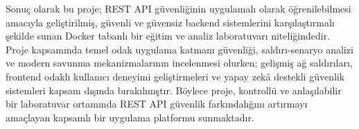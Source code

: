 Sonuç olarak bu proje; REST API güvenliğinin uygulamalı olarak öğrenilebilmesi amacıyla geliştirilmiş, güvenli ve güvensiz backend sistemlerini karşılaştırmalı şekilde sunan Docker tabanlı bir eğitim ve analiz laboratuvarı niteliğindedir. Proje kapsamında temel odak uygulama katmanı güvenliği, saldırı-senaryo analizi ve modern savunma mekanizmalarının incelenmesi olurken; gelişmiş ağ saldırıları, frontend odaklı kullanıcı deneyimi geliştirmeleri ve yapay zekâ destekli güvenlik sistemleri kapsam dışında bırakılmıştır. Böylece proje, kontrollü ve anlaşılabilir bir laboratuvar ortamında REST API güvenlik farkındalığını artırmayı amaçlayan kapsamlı bir uygulama platformu sunmaktadır.


\clearpage
